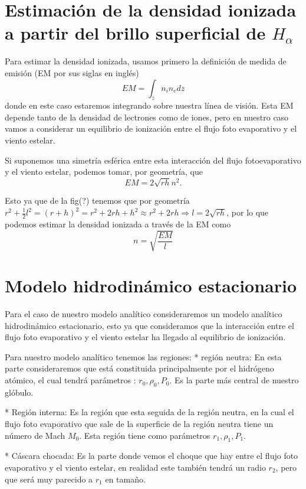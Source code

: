 \documentclass{book}
\begin{document}
\section{Estimación de la densidad ionizada a partir del brillo superficial de $H_\alpha$}

Para estimar la densidad ionizada, usamos primero la definición de medida de emisión (EM por sus siglas en inglés)
\[EM=\int_z n_in_edz\] donde en este caso estaremos integrando sobre nuestra línea de visión. Esta EM depende tanto de la densidad de lectrones como de iones, pero en nuestro caso vamos a considerar un equilibrio de ionización entre el flujo foto evaporativo y el viento estelar.

Si suponemos una simetría esférica entre esta interacción del flujo fotoevaporativo y el viento estelar, podemos tomar, por geometría, que
\[EM=2\sqrt{rh}n^2.\]


Esto ya que de la fig(?) tenemos que por geometría $r^2+\frac{1}{2}l^2=(r+h)^2=r^2+2rh+h^2\approx r^2+2rh\Rightarrow l=2\sqrt{rh}$, por lo que podemos estimar la densidad ionizada a través de la EM como \[n=\sqrt{\frac{EM}{l}}\]

\section{Modelo hidrodinámico estacionario}

Para el caso de nuestro modelo analítico consideraremos un modelo analítico hidrodinámico estacionario, esto ya que consideramos que la interacción entre el flujo foto evaporativo y el viento estelar ha llegado al equilibrio de ionización.


Para nuestro modelo analítico tenemos las regiones:
* región neutra: En esta parte consideraremos que está constituida principalmente por el hidrógeno atómico, el cual tendrá parámetros : $r_0,\rho_0,P_0$. Es la parte más central de nuestro glóbulo.

* Región interna: Es la región que esta seguida de la región neutra, en la cual el flujo foto evaporativo que sale de la superficie de la región neutra tiene un número de Mach $M_0$. Esta región tiene como parámetros $r_1,\rho_1,P_1$.

* Cáscara chocada: Es la parte donde vemos el choque que hay entre el flujo foto evaporativo y el viento estelar, en realidad este también tendrá un radio $r_2$, pero que será muy parecido a $r_1$ en tamaño.  
\end{document}
